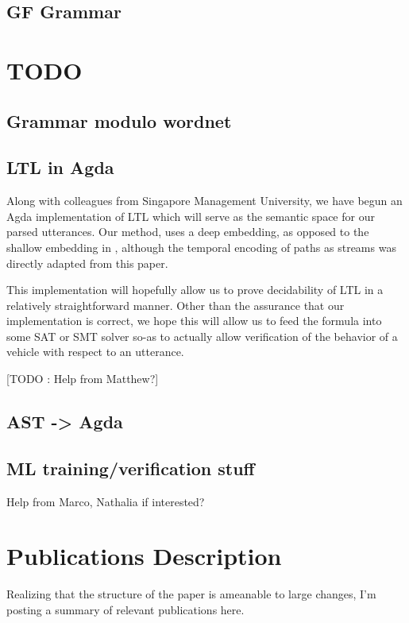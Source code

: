\documentclass[a4paper, 11pt]{article}
\begin{document}
\subsection{GF Grammar}

\section{TODO} 

\subsection{Grammar modulo wordnet}

\subsection{LTL in Agda}

Along with colleagues from Singapore Management University, we have begun an
Agda implementation \cite{wltl} of LTL which will serve as the semantic space
for our parsed utterances. Our method, uses a deep embedding, as opposed to the
shallow embedding in \cite{coqLTL}, although the temporal encoding of paths as
streams was directly adapted from this paper.

This implementation will hopefully allow us to prove decidability of LTL in a
relatively straightforward manner. Other than the assurance that our
implementation is correct, we hope this will allow us to feed the formula into
some SAT or SMT solver so-as to actually allow verification of the behavior of a
vehicle with respect to an utterance.

[TODO : Help from Matthew?]

\subsection{AST -> Agda}

\subsection{ML training/verification stuff}
Help from Marco, Nathalia if interested?


\section{Publications Description}

Realizing that the structure of the paper is ameanable to large changes, I'm
posting a summary of relevant publications here.
\end{document}
